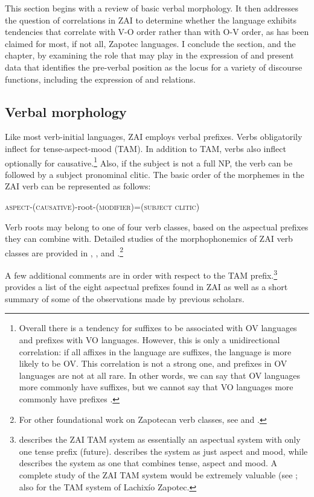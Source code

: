 This section begins with a review of basic verbal morphology. It then addresses the question of  correlations in ZAI to determine whether the language exhibits tendencies that correlate with V-O order rather than with O-V order, as has been claimed for most, if not all, Zapotec languages. I conclude the section, and the chapter, by examining the role that  may play in the expression of  and present data that identifies the pre-verbal position as the locus for a variety of discourse functions, including the expression of  and  relations. 



\subsection{Verbal morphology}\label{verbalmorphology}

Like most verb-initial languages, ZAI employs verbal prefixes. Verbs obligatorily inflect for tense-aspect-mood (TAM). In addition to TAM, verbs also inflect optionally for causative.\footnote{Overall there is a tendency for suffixes to be associated with OV languages and prefixes with VO languages. However, this is only a unidirectional correlation: if all affixes in the language are suffixes, the language is more likely to be OV. This correlation is not a strong one, and prefixes in OV languages are not at all rare. In other words, we can say that OV languages more commonly have suffixes, but we cannot say that VO languages more commonly have prefixes \citep{dryer2007}.} Also, if the subject is not a full NP, the verb can be followed by a subject pronominal clitic. The basic order of the morphemes in the ZAI verb can be represented as follows:


\vspace{3mm}
\textsc{aspect}-\textsc{(causative)}-root-\textsc{(modifier)}=\textsc{(subject clitic)}
\vspace{3mm}


Verb roots may belong to one of four verb classes, based on the aspectual prefixes they can combine with. Detailed studies of the morphophonemics of ZAI verb classes are provided in \citet{marlett1987}, \citet{enriquez2008}, and \citet{perez2015}.\footnote{For other foundational work on Zapotecan verb classes, see \citet{smithstark2002} and \citet{campbell2011}.}

A few additional comments are in order with respect to the TAM prefix.\footnote{\citet{pickett1998} describes the ZAI TAM system as essentially an aspectual system with only one tense prefix (future). \citet{mock1990} describes the system as just aspect and mood, while \citet{suarez1983} describes the system as one that combines tense, aspect and mood. A complete study of the ZAI TAM system would be extremely valuable (see \citet{perez2015}; also \citet{sicoli2015} for the TAM system of Lachix\'{i}o Zapotec.}  provides a list of the eight aspectual prefixes found in ZAI as well as a short summary of some of the observations made by previous scholars.  

